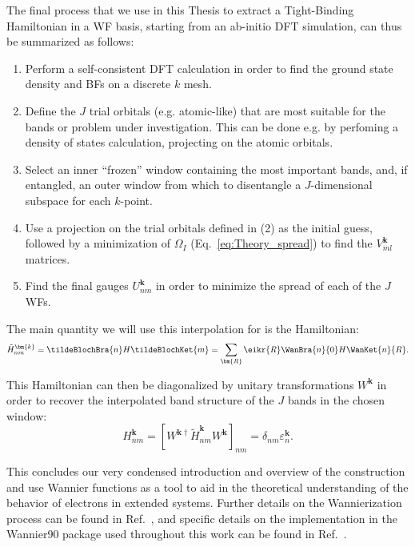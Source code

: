 The final process that we use in this Thesis to extract a Tight-Binding Hamiltonian in a WF basis, starting from an ab-initio DFT simulation, can thus be summarized as follows:
\begin{enumerate}
	\item Perform a self-consistent DFT calculation in order to find the ground state density and BFs on a discrete $k$ mesh.
	\item Define the $J$ trial orbitals (e.g. atomic-like) that are most suitable for the bands or problem under investigation. This can be done e.g. by perfoming a density of states calculation, projecting on the atomic orbitals.
	\item Select an inner ``frozen'' window containing the most important bands, and, if entangled, an outer window from which to disentangle a $J$-dimensional subspace for each $k$-point.
	\item Use a projection on the trial orbitals defined in (2) as the initial guess, followed by a minimization of $\Omega_I$ (Eq.~\eqref{eq:Theory_spread}) to find the $V_{ml}^{\bm{k}}$ matrices.
	\item Find the final gauges $U_{nm}^{\bm{k}}$ in order to minimize the spread of each of the $J$ WFs.
\end{enumerate}

The main quantity we will use this interpolation for is the Hamiltonian:
\begin{equation}
	\label{eq:Theory_waninterp}
	\tilde{H}_{nm}^{\bm{k}} = \tildeBlochBra{n} H \tildeBlochKet{m} = \sum_{\bm{R}} \eikr{R} \WanBra{n}{0}H\WanKet{n}{R}.
\end{equation}

This Hamiltonian can then be diagonalized by unitary transformations $W^{\bm{k}}$ in order to recover the interpolated band structure of the $J$ bands in the chosen window:
\begin{equation}
H_{nm}^{\bm{k}} = [W^{\bm{k}\dagger} \tilde{H}_{nm}^{\bm{k}} W^{\bm{k}}]_{nm} = \delta_{nm} \varepsilon_{n}^{\bm{k}}.
\end{equation}

This concludes our very condensed introduction and overview of the construction and use Wannier functions as a tool to aid in the theoretical understanding of the behavior of electrons in extended systems.
Further details on the Wannierization process can be found in Ref.~\cite{Marzari2012}, and specific details on the implementation in the Wannier90 package used throughout this work can be found in Ref.~\cite{Mostofi2014AnFunctions}.

